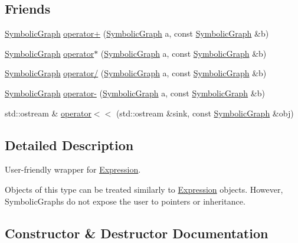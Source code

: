 \subsection*{Friends}
\begin{DoxyCompactItemize}
\item 
\mbox{\hyperlink{classsymcpp_1_1SymbolicGraph}{Symbolic\+Graph}} \mbox{\hyperlink{classsymcpp_1_1SymbolicGraph_aefac47289460c9fb34141bd2a20809f1}{operator+}} (\mbox{\hyperlink{classsymcpp_1_1SymbolicGraph}{Symbolic\+Graph}} a, const \mbox{\hyperlink{classsymcpp_1_1SymbolicGraph}{Symbolic\+Graph}} \&b)
\item 
\mbox{\hyperlink{classsymcpp_1_1SymbolicGraph}{Symbolic\+Graph}} \mbox{\hyperlink{classsymcpp_1_1SymbolicGraph_a895a3848ca9605036f07e73412b8493b}{operator$\ast$}} (\mbox{\hyperlink{classsymcpp_1_1SymbolicGraph}{Symbolic\+Graph}} a, const \mbox{\hyperlink{classsymcpp_1_1SymbolicGraph}{Symbolic\+Graph}} \&b)
\item 
\mbox{\hyperlink{classsymcpp_1_1SymbolicGraph}{Symbolic\+Graph}} \mbox{\hyperlink{classsymcpp_1_1SymbolicGraph_a75795007fbed7da119eb3ed6838c341e}{operator/}} (\mbox{\hyperlink{classsymcpp_1_1SymbolicGraph}{Symbolic\+Graph}} a, const \mbox{\hyperlink{classsymcpp_1_1SymbolicGraph}{Symbolic\+Graph}} \&b)
\item 
\mbox{\hyperlink{classsymcpp_1_1SymbolicGraph}{Symbolic\+Graph}} \mbox{\hyperlink{classsymcpp_1_1SymbolicGraph_af0e10f19ffb94557b68c8f10b110f030}{operator-\/}} (\mbox{\hyperlink{classsymcpp_1_1SymbolicGraph}{Symbolic\+Graph}} a, const \mbox{\hyperlink{classsymcpp_1_1SymbolicGraph}{Symbolic\+Graph}} \&b)
\item 
std\+::ostream \& \mbox{\hyperlink{classsymcpp_1_1SymbolicGraph_a653fedc6ac7ca152b1d40ad887b9af42}{operator$<$$<$}} (std\+::ostream \&sink, const \mbox{\hyperlink{classsymcpp_1_1SymbolicGraph}{Symbolic\+Graph}} \&obj)
\end{DoxyCompactItemize}


\subsection{Detailed Description}
User-\/friendly wrapper for \mbox{\hyperlink{classsymcpp_1_1Expression}{Expression}}. 

Objects of this type can be treated similarly to \mbox{\hyperlink{classsymcpp_1_1Expression}{Expression}} objects. However, Symbolic\+Graphs do not expose the user to pointers or inheritance. 

\subsection{Constructor \& Destructor Documentation}
\mbox{\label{classsymcpp_1_1SymbolicGraph_a204812fa110d379566114bf1735014d6}} 

